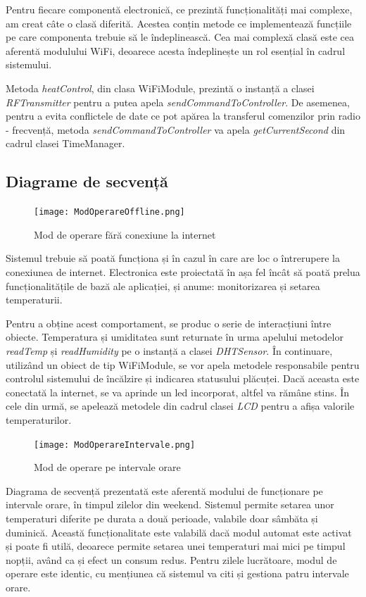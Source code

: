 	Pentru fiecare componentă electronică, ce prezintă funcționalități mai complexe, am creat câte o clasă diferită. Acestea conțin metode ce implementează funcțiile pe care componenta trebuie să le îndeplinească. Cea mai complexă clasă este cea aferentă modulului WiFi, deoarece acesta îndeplinește un rol esențial în cadrul sistemului.

	Metoda \textit{heatControl}, din clasa WiFiModule, prezintă o instanță a clasei \textit{RFTransmitter} pentru a putea apela \textit{sendCommandToController}. De asemenea, pentru a evita conflictele de date ce pot apărea la transferul comenzilor prin radio - frecvență, metoda \textit{sendCommandToController} va apela \textit{getCurrentSecond} din cadrul clasei TimeManager.
 	
\subsection{Diagrame de secvență}

\begin{figure}[H]
   	\centering
    	\texttt{[image: ModOperareOffline.png]}
	\caption{Mod de operare fără conexiune la internet}
\end{figure}

	Sistemul trebuie să poată funcționa și în cazul în care are loc o întrerupere la conexiunea de internet. Electronica este proiectată în așa fel încât să poată prelua funcționali\-tățile de bază ale aplicației, și anume: monitorizarea și setarea temperaturii.
	
	Pentru a obține acest comportament, se produc o serie de interacțiuni între obiecte. Temperatura și umiditatea sunt returnate în urma apelului metodelor \textit{readTemp} și \textit{readHumidity} pe o instanță a clasei \textit{DHTSensor}. În continuare, utilizând un obiect de tip WiFiModule, se vor apela metodele responsabile pentru controlul sistemului de încălzire și indicarea statusului plăcuței. Dacă aceasta este conectată la internet, se va aprinde un led incorporat, altfel va rămâne stins. În cele din urmă, se apelează metodele din cadrul clasei \textit{LCD} pentru a afișa valorile temperaturilor.

\begin{figure}[H]
   	\centering
    	\texttt{[image: ModOperareIntervale.png]}
	\caption{Mod de operare pe intervale orare}
\end{figure}

	Diagrama de secvență prezentată este aferentă modului de funcționare pe intervale orare, în timpul zilelor din weekend. Sistemul permite setarea unor temperaturi diferite pe durata a două perioade, valabile doar sâmbăta și duminică. Această funcționalitate este valabilă dacă modul automat este activat și poate fi utilă, deoarece permite setarea unei temperaturi mai mici pe timpul nopții, având ca și efect un consum redus. Pentru zilele lucrătoare, modul de operare este identic, cu mențiunea că sistemul va citi și gestiona patru intervale orare.

